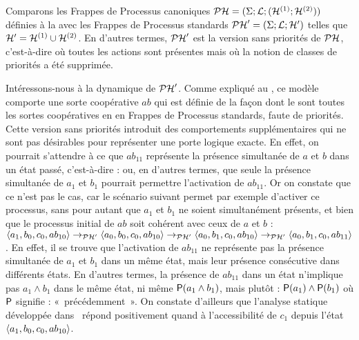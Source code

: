 \begin{example}
  Comparons les Frappes de Processus canoniques $\PH = (\PHs; \PHl; (\PHa^{(1)}; \PHa^{(2)}))$
  définies à la  avec 
  les Frappes de Processus standards $\PH' = (\PHs; \PHl; \PHh')$
  telles que $\PHh' = \PHh^{(1)} \cup \PHh^{(2)}$.
  En d'autres termes, $\PH'$ est la version sans priorités de $\PH$,
  c'est-à-dire où toutes les actions sont présentes mais où la notion de classes de priorités
  a été supprimée.
  
  Intéressons-nous à la dynamique de $\PH'$.
  Comme expliqué au ,
  ce modèle comporte une sorte coopérative $ab$ qui est définie de la façon
  dont le sont toutes les sortes coopératives en
  en Frappes de Processus standards, faute de priorités.
  Cette version sans priorités introduit des comportements supplémentaires qui ne sont pas
  désirables pour représenter une porte logique exacte.
  En effet, on pourrait s'attendre à ce que $ab_{11}$ représente la présence simultanée
  de $a$ et $b$ dans un état passé, c'est-à-dire :
  ou, en d'autres termes, que seule la présence simultanée de $a_1$ et $b_1$ pourrait
  permettre l'activation de $ab_{11}$.
  Or on constate que ce n'est pas le cas, car le scénario suivant permet par exemple d'activer
  ce processus, sans pour autant que $a_1$ et $b_1$ ne soient simultanément présents,
  et bien que le processus initial de $ab$ soit cohérent avec ceux de $a$ et $b$ :
  $\PHstate{a_1, b_0, c_0, ab_{10}} \PHtrans[\PH']
  \PHstate{a_0, b_0, c_0, ab_{10}} \PHtrans[\PH']
  \PHstate{a_0, b_1, c_0, ab_{10}} \PHtrans[\PH']
  \PHstate{a_0, b_1, c_0, ab_{11}}$.
  En effet, il se trouve que l'activation de $ab_{11}$ ne représente pas la présence simultanée
  de $a_1$ et $b_1$ dans un même état, mais leur présence consécutive dans
  différents états.
  En d'autres termes, la présence de $ab_{11}$ dans un état n'implique pas
  $a_1 \wedge b_1$ dans le même état, ni même
  $\tempop(a_1 \wedge b_1)$, mais plutôt : $\tempop(a_1) \wedge \tempop(b_1)$
  où $\tempop$ signifie : «~précédemment~».
  On constate d'ailleurs que l'analyse statique développée dans~\cite{PMR12-MSCS}
  répond positivement quand à l'accessibilité de $c_1$ depuis l'état
  $\PHstate{a_1, b_0, c_0, ab_{10}}$.
  

\end{example}
